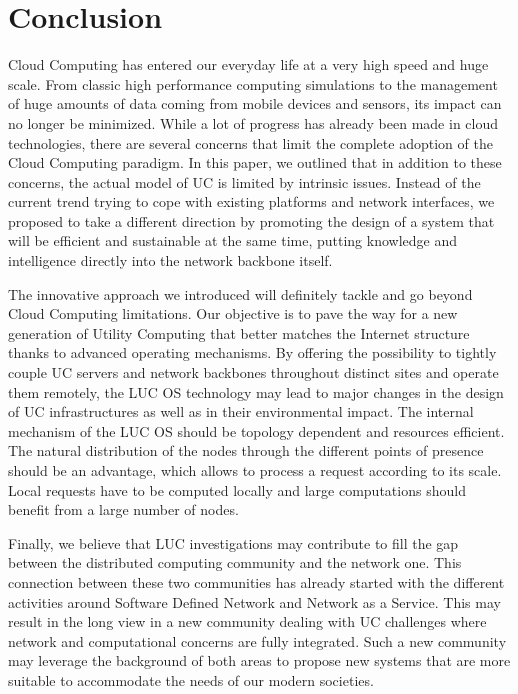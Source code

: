 \section{Conclusion \label{sec:conclusion}}


Cloud Computing has entered our everyday life at a very high speed and huge
scale. From classic high performance computing simulations to the management of
huge amounts of data coming from mobile devices and sensors, its impact can no
longer be minimized. While a lot of progress has already been made in cloud
technologies, there are several concerns that limit the complete adoption of
the Cloud Computing paradigm. %
In this paper, we outlined that in addition to these concerns, the actual model
of UC is limited by intrinsic issues.  Instead of the current trend trying to
cope with existing platforms and network interfaces, we proposed to take a
different direction by promoting the design of a system that will be efficient and sustainable at the same time, putting knowledge and intelligence
directly into the network backbone itself.

The innovative approach we introduced will definitely tackle and go beyond
Cloud Computing limitations. Our objective is to pave the way for a new
generation of Utility Computing that better matches the Internet structure
thanks to advanced operating mechanisms.  By offering the possibility to
tightly couple UC servers and network backbones throughout distinct sites and
operate them remotely, the LUC OS technology may lead to major changes in the
design of UC infrastructures as well as in their environmental impact.  The
internal mechanism of the LUC OS should be topology dependent and resources
efficient. The natural distribution of the nodes through the different points
of presence should be an advantage, which allows to process a request according
to its scale. Local requests have to be computed locally and large computations
should benefit from a large number of nodes.

Finally, we believe that LUC investigations may contribute to fill the gap
between the distributed computing community and the network one. This
connection between these two communities has already started with the different
activities around Software Defined Network and Network as a Service. This may
result in the long view in a new community dealing with UC challenges where
network and computational concerns are fully integrated. Such a new community
may leverage the background of both areas to propose new systems that are more
suitable to accommodate the needs of our modern societies.


